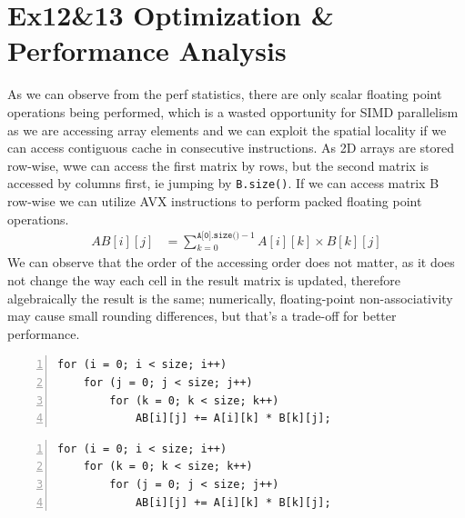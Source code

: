 \documentclass[a4paper]{article}
\begin{document}
\section*{Ex12\&13 Optimization \& Performance Analysis}
As we can observe from the perf statistics, there are only scalar floating point operations being performed, 
which is a wasted opportunity for SIMD parallelism as we are accessing array elements and we can exploit the spatial locality 
if we can access contiguous cache in consecutive instructions. As 2D arrays are stored row-wise, wwe can access the first matrix by rows, 
but the second matrix is accessed by columns first, ie jumping by \texttt{B.size()}. If we can access matrix B row-wise we can utilize AVX
instructions to perform packed floating point operations. 
\begin{align*}
    AB[i][j] &= \sum_{k=0}^{\texttt{A[0].size()}-1} A[i][k] \times B[k][j]
\end{align*}
We can observe that the order of the accessing order does not matter, as it does not change the way each cell in the result matrix is updated, 
therefore algebraically the result is the same; numerically, floating-point non-associativity may cause small rounding differences, but that's 
a trade-off for better performance.
\par\vspace{3ex}
\begin{minipage}{0.4\linewidth}
\begin{Verbatim}[frame=topline,numbers=left,label= Original,framesep=3mm]
for (i = 0; i < size; i++)
    for (j = 0; j < size; j++)
        for (k = 0; k < size; k++)
            AB[i][j] += A[i][k] * B[k][j];
\end{Verbatim}
\end{minipage}\hfill
\begin{minipage}{0.4\linewidth}
\begin{Verbatim}[frame=topline,numbers=left,label= Optimized,framesep=3mm]
for (i = 0; i < size; i++)
    for (k = 0; k < size; k++)
        for (j = 0; j < size; j++)
            AB[i][j] += A[i][k] * B[k][j];
\end{Verbatim}
\end{minipage}\hfill
\par\vspace{3ex}
\end{document}
